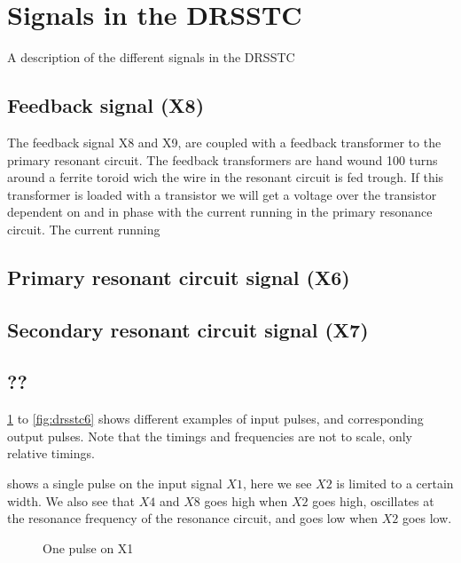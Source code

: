 \section{Signals in the DRSSTC}
A description of the different signals in the DRSSTC

\subsection{Feedback signal (X8)}
The feedback signal X8 and X9, are coupled with a feedback transformer to the primary resonant circuit. The feedback transformers are hand wound 100 turns around a ferrite toroid wich the wire in the resonant circuit is fed trough. If this transformer is loaded with a transistor we will get a voltage over the transistor dependent on and in phase with the current running in the primary resonance circuit. The current running 

\subsection{Primary resonant circuit signal (X6)}

\subsection{Secondary resonant circuit signal (X7)}

\subsection{??}

\cref{fig:drsstc1} to \cref{fig:drsstc6} shows different examples of input pulses, and corresponding output pulses. Note that the timings and frequencies are not to scale, only relative timings.

 shows a single pulse on the input signal $X1$, here we see $X2$ is limited to a certain width. We also see that $X4$ and $X8$ goes high when $X2$ goes high, oscillates at the resonance frequency of the resonance circuit, and goes low when $X2$ goes low.

\begin{figure}[!ht]
    \centering
    \caption{One pulse on X1}
    \label{fig:drsstc1}
\end{figure}{}

